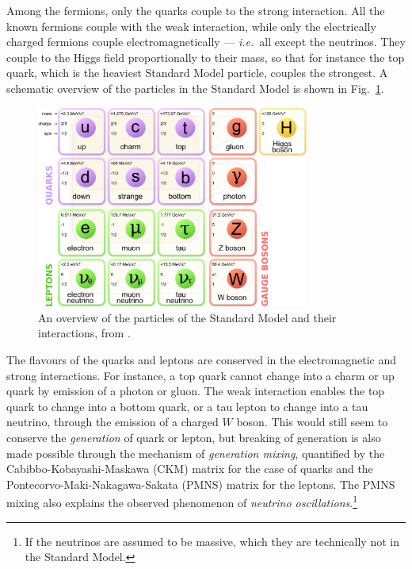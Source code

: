 \documentclass[twoside,english]{uiofysmaster}
\begin{document}
Among the fermions, only the quarks couple to the strong interaction. All the known fermions couple with the weak interaction, while only the electrically charged fermions couple electromagnetically --- {\it i.e.}\ all except the neutrinos. They couple to the Higgs field proportionally to their mass, so that for instance the top quark, which is the heaviest Standard Model particle, couples the strongest. A schematic overview of the particles in the Standard Model is shown in Fig.\  \ref{fig:SM_particles}.
\begin{figure}[hbt]
	\centering
	\includegraphics[width=0.8\textwidth]{figures/susyintro/Standard_Model_of_Elementary_Particles.pdf}
	\caption{An overview of the particles of the Standard Model and their interactions, from \cite{Wikimedia_SM_particles}.}
	\label{fig:SM_particles}
\end{figure}

The flavours of the quarks and leptons are conserved in the electromagnetic and strong interactions. For instance, a top quark cannot change into a charm or up quark by emission of a photon or gluon. The weak interaction enables the top quark to change into a bottom quark, or a tau lepton to change into a tau neutrino, through the emission of a charged $W$ boson. This would still seem to conserve the {\it generation} of quark or lepton, but breaking of generation is also made possible through the mechanism of {\it generation mixing}, quantified by the Cabibbo-Kobayashi-Maskawa (CKM) matrix for the case of quarks and the Pontecorvo-Maki-Nakagawa-Sakata (PMNS) matrix for the leptons. The PMNS mixing also explains the observed phenomenon of {\it neutrino oscillations}.\footnote{If the neutrinos are assumed to be massive, which they are technically not in the Standard Model.}
\end{document}
